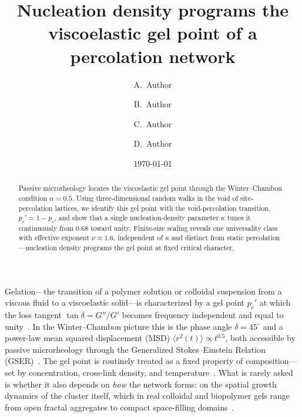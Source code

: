 \documentclass[aps,prl,twocolumn,superscriptaddress,floatfix,nofootinbib]{revtex4-2}
\newcommand{\msd}{\langle r^2(t)\rangle}
\newcommand{\pc}{p_c}
\newcommand{\pcp}{p_c'}
\newcommand{\kap}{\kappa}
\begin{document}
\title{Nucleation density programs the viscoelastic gel point of a percolation network}

\author{A.~Author}
\author{B.~Author}
\author{C.~Author}
\author{D.~Author}
\affiliation{[Affiliation], [Institution], [City], [Country]}

\date{\today}

\begin{abstract}
Passive microrheology locates the viscoelastic gel point through the Winter--Chambon condition $\alpha=0.5$. Using three-dimensional random walks in the void of site-percolation lattices, we identify this gel point with the void-percolation transition, $\pcp = 1-\pc$, and show that a single nucleation-density parameter $\kap$ tunes it continuously from $0.68$ toward unity. Finite-size scaling reveals one universality class with effective exponent $\nu\approx1.6$, independent of $\kap$ and distinct from static percolation---nucleation density programs the gel point at fixed critical character.
\end{abstract}

\maketitle

Gelation---the transition of a polymer solution or colloidal suspension from a viscous fluid to a viscoelastic solid---is characterized by a gel point $\pcp$ at which the loss tangent $\tan\delta = G''/G'$ becomes frequency independent and equal to unity~\cite{Chambon1987,Winter1987}. In the Winter--Chambon picture this is the phase angle $\delta=45^{\circ}$ and a power-law mean squared displacement (MSD) $\msd\propto t^{0.5}$, both accessible by passive microrheology through the Generalized Stokes--Einstein Relation (GSER)~\cite{Mason1995,Mason2000,Squires2010fluid}. The gel point is routinely treated as a fixed property of composition---set by concentration, cross-link density, and temperature~\cite{Rubinstein2003,Larson1999}. What is rarely asked is whether it also depends on \emph{how} the network forms: on the spatial growth dynamics of the cluster itself, which in real colloidal and biopolymer gels range from open fractal aggregates to compact space-filling domains~\cite{Trappe2001,Gibaud2012,Ng2016}.
\end{document}

